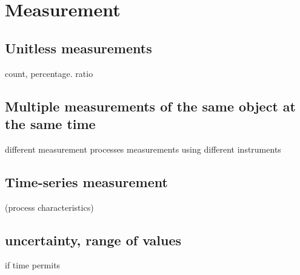\chapter{Measurement}


\section{Unitless measurements}
count, percentage. ratio

\section{Multiple measurements of the same object at the same time}
different measurement processes 
measurements using different instruments

\section{Time-series measurement}
(process characteristics)

\section{uncertainty, range of values}
if time permits

